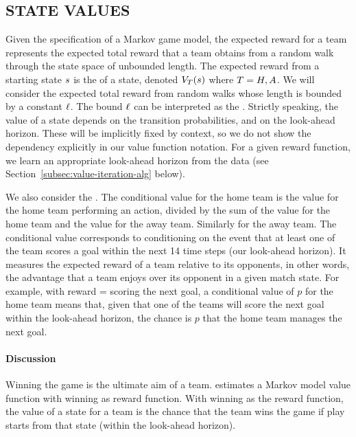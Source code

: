\subsection{STATE VALUES}

Given the specification of a Markov game model, 
the expected reward for a team %
represents the expected total reward that a team obtains from a random walk through the state space of unbounded length. The expected reward from a starting state $s$ is the  of a state, denoted $V_{T}(s)$ where $T = H,A$. We will consider the expected total reward from random walks whose length is bounded by a constant $\ell$. The bound $\ell$ can be interpreted as the .  Strictly speaking, the value of a state depends on the transition probabilities, and on the look-ahead horizon. These will be implicitly fixed by context, so we do not  show the dependency explicitly in our value function notation. For a given reward function, we learn an appropriate look-ahead horizon from the data  (see Section~\ref{subsec:value-iteration-alg} below). 

We also consider the . The conditional value for the home team is the value for the home team performing an action, divided by the sum of the value for the home team and the value for the away team. Similarly for the away team. The conditional value corresponds to conditioning on the event that at least one of the team scores a goal within the next 14 time steps (our look-ahead horizon). It measures the expected reward of a team relative to its opponents, in other words, the advantage that a team enjoys over its opponent in a given match state. For example, with reward = scoring the next goal, a conditional value of $p$ for the home team means that, given that one of the teams will score the next goal within the look-ahead horizon, the chance is $p$ that the home team manages the next goal.

\paragraph{Discussion} Winning the game is the ultimate aim of a team. \citep{Pettigrew2015} estimates a Markov model value function with winning as reward function. With winning as the reward function, the value of a state for a team is the chance that the team wins the game if play starts from that state (within the look-ahead horizon).

